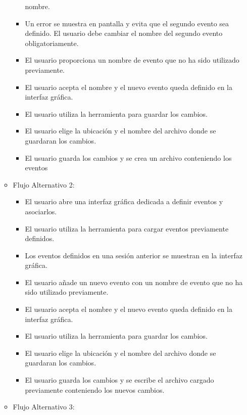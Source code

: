 \begin{itemize}
\begin{itemize}
\begin{itemize}
       		    nombre.
       		    \item Un error se muestra en pantalla y evita que el segundo evento
       		    sea definido. El usuario debe cambiar el nombre del segundo evento
       		    obligatoriamente.
       		    \item El usuario proporciona un nombre de evento que no ha
       		    sido utilizado previamente.
       		    \item El usuario acepta el nombre y el nuevo evento queda definido
       		    en la interfaz gráfica.
       		    \item El usuario utiliza la herramienta para guardar los cambios.
       		    \item El usuario elige la ubicación y el nombre del archivo donde
       		    se guardaran los cambios.
       		    \item El usuario guarda los cambios y se crea un archivo
       		    conteniendo los eventos
	    	\end{itemize}
	    \item Flujo Alternativo 2: 
           	\begin{itemize}
       		    \item El usuario abre una interfaz gráfica dedicada a definir
       		    eventos y asociarlos.
       		    \item El usuario utiliza la herramienta para cargar eventos
       		    previamente definidos.
       		    \item Los eventos definidos en una sesión anterior se muestran en
       		    la interfaz gráfica.
       		    \item El usuario añade un nuevo evento con un nombre de evento que no ha
       		    sido utilizado previamente.
       		    \item El usuario acepta el nombre y el nuevo evento queda definido
       		    en la interfaz gráfica.
       		    \item El usuario utiliza la herramienta para guardar los cambios.
       		    \item El usuario elige la ubicación y el nombre del archivo donde
       		    se guardaran los cambios.
       		    \item El usuario guarda los cambios y se escribe el archivo
       		    cargado previamente conteniendo los nuevos cambios.
	    	\end{itemize}
	    \item Flujo Alternativo 3:
	    	\begin{itemize}

\end{itemize}
\end{itemize}
\end{itemize}
